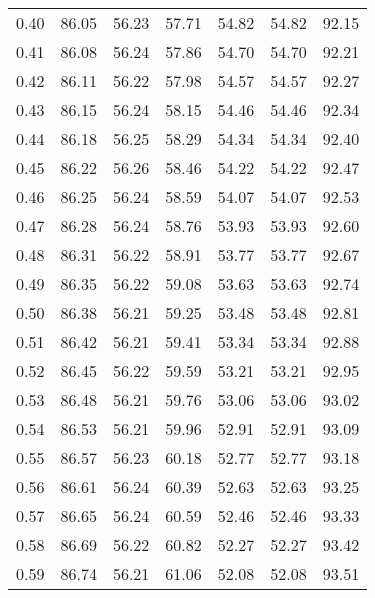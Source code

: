 \begin{tabular}{|c|c|c|c|c|c|c|}
      0.40 &     86.05 &     56.23 &      57.71 &   54.82 &      54.82 &         92.15 \\
      0.41 &     86.08 &     56.24 &      57.86 &   54.70 &      54.70 &         92.21 \\
      0.42 &     86.11 &     56.22 &      57.98 &   54.57 &      54.57 &         92.27 \\
      0.43 &     86.15 &     56.24 &      58.15 &   54.46 &      54.46 &         92.34 \\
      0.44 &     86.18 &     56.25 &      58.29 &   54.34 &      54.34 &         92.40 \\
      0.45 &     86.22 &     56.26 &      58.46 &   54.22 &      54.22 &         92.47 \\
      0.46 &     86.25 &     56.24 &      58.59 &   54.07 &      54.07 &         92.53 \\
      0.47 &     86.28 &     56.24 &      58.76 &   53.93 &      53.93 &         92.60 \\
      0.48 &     86.31 &     56.22 &      58.91 &   53.77 &      53.77 &         92.67 \\
      0.49 &     86.35 &     56.22 &      59.08 &   53.63 &      53.63 &         92.74 \\
      0.50 &     86.38 &     56.21 &      59.25 &   53.48 &      53.48 &         92.81 \\
      0.51 &     86.42 &     56.21 &      59.41 &   53.34 &      53.34 &         92.88 \\
      0.52 &     86.45 &     56.22 &      59.59 &   53.21 &      53.21 &         92.95 \\
      0.53 &     86.48 &     56.21 &      59.76 &   53.06 &      53.06 &         93.02 \\
      0.54 &     86.53 &     56.21 &      59.96 &   52.91 &      52.91 &         93.09 \\
      0.55 &     86.57 &     56.23 &      60.18 &   52.77 &      52.77 &         93.18 \\
      0.56 &     86.61 &     56.24 &      60.39 &   52.63 &      52.63 &         93.25 \\
      0.57 &     86.65 &     56.24 &      60.59 &   52.46 &      52.46 &         93.33 \\
      0.58 &     86.69 &     56.22 &      60.82 &   52.27 &      52.27 &         93.42 \\
      0.59 &     86.74 &     56.21 &      61.06 &   52.08 &      52.08 &         93.51 \\

\end{tabular}
